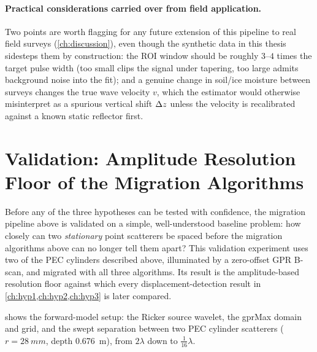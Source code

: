 \paragraph{Practical considerations carried over from field application.}
Two points are worth flagging for any future extension of this pipeline to
real field surveys (\cref{ch:discussion}), even though the synthetic data in
this thesis sidesteps them by construction: the ROI window should be roughly
$3$--$4$ times the target pulse width (too small clips the signal under
tapering, too large admits background noise into the fit); and a genuine
change in soil/ice moisture between surveys changes the true wave velocity
$v$, which the estimator would otherwise misinterpret as a spurious vertical
shift $\Delta z$ unless the velocity is recalibrated against a known static
reflector first.

\section{Validation: Amplitude Resolution Floor of the Migration Algorithms}
\label{sec:meth-resolution}

Before any of the three hypotheses can be tested with confidence, the
migration pipeline above is validated on a simple, well-understood baseline
problem: how closely can two \emph{stationary} point scatterers be spaced
before the migration algorithms above can no longer tell them apart? This
validation experiment uses two of the PEC cylinders described above,
illuminated by a zero-offset GPR B-scan, and migrated with all three
algorithms. Its result is the amplitude-based resolution floor against which
every displacement-detection result in \cref{ch:hyp1,ch:hyp2,ch:hyp3} is
later compared.

 shows the forward-model setup: the Ricker source
wavelet, the gprMax domain and grid, and the swept separation between two
PEC cylinder scatterers ($r=\SI{28}{mm}$, depth \SI{0.676}{m}), from
$2\lambda$ down to $\tfrac{1}{16}\lambda$.


